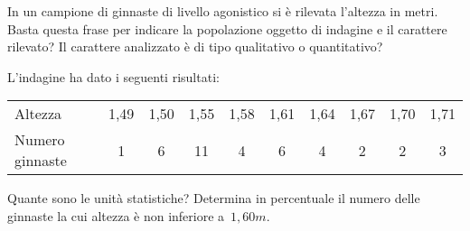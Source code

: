 \begin{esercizio}
\label{ese:A.8}
In un campione di ginnaste di livello agonistico si è rilevata l'altezza in metri. Basta questa frase per indicare la popolazione oggetto
di indagine e il carattere rilevato? Il carattere analizzato è di tipo qualitativo o quantitativo?

L'indagine ha dato i seguenti risultati:
\begin{center}
 \begin{tabular}{lccccccccc}
\toprule
Altezza & 1,49 & 1,50 & 1,55 & 1,58 & 1,61 & 1,64 & 1,67 & 1,70 & 1,71 \\
Numero ginnaste & 1 & 6 & 11 & 4 & 6 & 4 & 2 & 2 & 3 \\
\bottomrule
\end{tabular}
\end{center}
Quante sono le unità statistiche? Determina in percentuale il numero delle ginnaste la cui altezza è non inferiore a~$1,60 \unit{m}$.
\end{esercizio}

